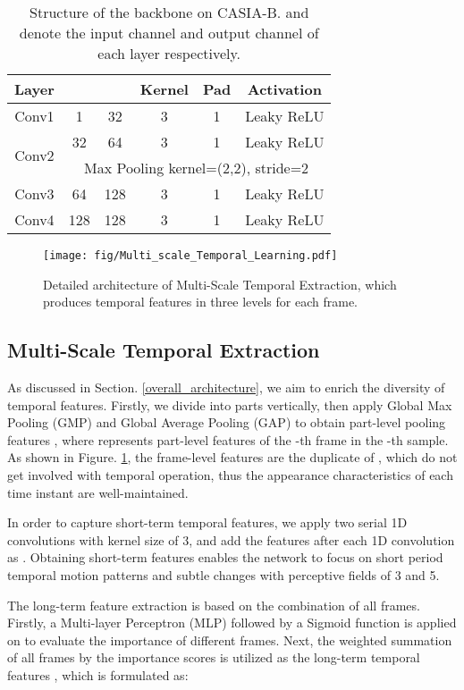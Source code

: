 \documentclass[journal]{IEEEtran}
\begin{document}
\begin{table}[ht]
 \centering
 \caption{Structure of the backbone on CASIA-B.  and  denote the input channel and output channel of each layer respectively.}
 \begin{tabular}{|c|c|c|c|c|c|}
 \hline
    Layer &  &  & Kernel & Pad & Activation  \\\hline
    Conv1 & 1 & 32 & 3 & 1 & Leaky ReLU \\\hline
    \multirow{2}{*}{Conv2} & 32 & 64 & 3 & 1 & Leaky ReLU \\\cline{2-6}
    & \multicolumn{5}{c|}{Max Pooling kernel=(2,2), stride=2} \\\hline
    Conv3 & 64 & 128 & 3 & 1 & Leaky ReLU\\\hline
    Conv4 & 128 & 128 & 3 & 1 & Leaky ReLU\\\hline
 \end{tabular}
 \label{tab:backbone}
\end{table}

\begin{figure}[t]
     \centering
     \texttt{[image: fig/Multi\_scale\_Temporal\_Learning.pdf]}
     \caption{Detailed architecture of Multi-Scale Temporal Extraction, which produces temporal features in three levels for each frame.}
     \label{MTFL}
 \end{figure}

\subsection{Multi-Scale Temporal Extraction}
As discussed in Section. \ref{overall_architecture}, we aim to enrich the diversity of temporal features. Firstly, we divide  into  parts vertically, then apply Global Max Pooling (GMP) and Global Average Pooling (GAP) to obtain part-level pooling features , where  represents part-level features of the -th frame in the -th sample. As shown in Figure. \ref{MTFL}, the frame-level features are the duplicate of , which do not get involved with temporal operation, thus the appearance characteristics of each time instant are well-maintained.

In order to capture short-term temporal features, we apply two serial 1D convolutions with kernel size of 3, and add the features after each 1D convolution as . Obtaining short-term features enables the network to focus on short period temporal motion patterns and subtle changes with perceptive fields of 3 and 5.

The long-term feature extraction is based on the combination of all frames. Firstly, a Multi-layer Perceptron (MLP) followed by a Sigmoid function is applied on  to evaluate the importance of different frames. Next, the weighted summation of all frames by the importance scores is utilized as the long-term temporal features , which is formulated as:
\end{document}
